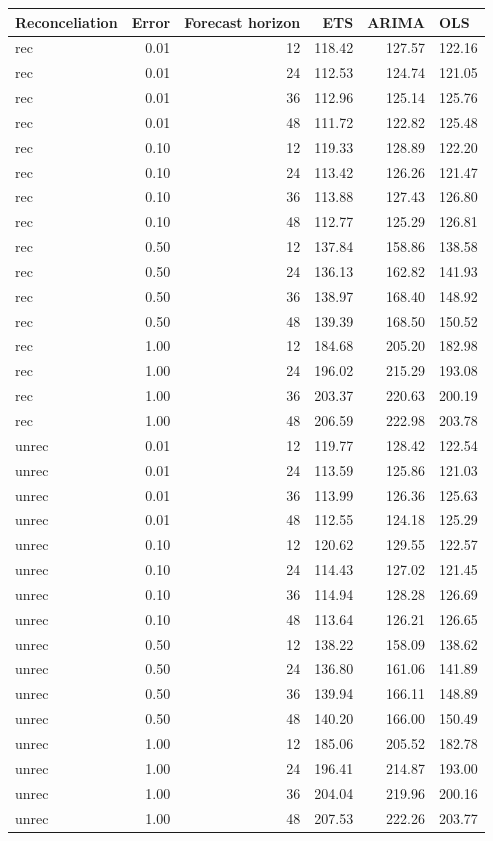\documentclass[11pt,a4paper,]{article}
\let\origtable\table
\let\endorigtable\endtable
\renewenvironment{table}[1][2] {
    \expandafter\origtable\expandafter[!htbp]
} {
    \endorigtable
}
\begin{document}
\begin{table}[!h]
\caption{\label{tab:TourismdatasimfixnoiseFH}Mean(RMSE) on one to four year test set with different error levels for ETS, ARIMA and OLS with and without reconciliation - Fixed origin - 304 bottom level series and 8 levels of hierarchy - Simulated tourism dataset}
\centering
\begin{tabular}[t]{lrrrrl}
\toprule
Reconceliation & Error & Forecast horizon & ETS & ARIMA & OLS\\
\midrule
rec & 0.01 & 12 & 118.42 & 127.57 & 122.16\\
rec & 0.01 & 24 & 112.53 & 124.74 & 121.05\\
rec & 0.01 & 36 & 112.96 & 125.14 & 125.76\\
rec & 0.01 & 48 & 111.72 & 122.82 & 125.48\\
rec & 0.10 & 12 & 119.33 & 128.89 & 122.20\\
rec & 0.10 & 24 & 113.42 & 126.26 & 121.47\\
rec & 0.10 & 36 & 113.88 & 127.43 & 126.80\\
rec & 0.10 & 48 & 112.77 & 125.29 & 126.81\\
rec & 0.50 & 12 & 137.84 & 158.86 & 138.58\\
rec & 0.50 & 24 & 136.13 & 162.82 & 141.93\\
rec & 0.50 & 36 & 138.97 & 168.40 & 148.92\\
rec & 0.50 & 48 & 139.39 & 168.50 & 150.52\\
rec & 1.00 & 12 & 184.68 & 205.20 & 182.98\\
rec & 1.00 & 24 & 196.02 & 215.29 & 193.08\\
rec & 1.00 & 36 & 203.37 & 220.63 & 200.19\\
rec & 1.00 & 48 & 206.59 & 222.98 & 203.78\\
unrec & 0.01 & 12 & 119.77 & 128.42 & 122.54\\
unrec & 0.01 & 24 & 113.59 & 125.86 & 121.03\\
unrec & 0.01 & 36 & 113.99 & 126.36 & 125.63\\
unrec & 0.01 & 48 & 112.55 & 124.18 & 125.29\\
unrec & 0.10 & 12 & 120.62 & 129.55 & 122.57\\
unrec & 0.10 & 24 & 114.43 & 127.02 & 121.45\\
unrec & 0.10 & 36 & 114.94 & 128.28 & 126.69\\
unrec & 0.10 & 48 & 113.64 & 126.21 & 126.65\\
unrec & 0.50 & 12 & 138.22 & 158.09 & 138.62\\
unrec & 0.50 & 24 & 136.80 & 161.06 & 141.89\\
unrec & 0.50 & 36 & 139.94 & 166.11 & 148.89\\
unrec & 0.50 & 48 & 140.20 & 166.00 & 150.49\\
unrec & 1.00 & 12 & 185.06 & 205.52 & 182.78\\
unrec & 1.00 & 24 & 196.41 & 214.87 & 193.00\\
unrec & 1.00 & 36 & 204.04 & 219.96 & 200.16\\
unrec & 1.00 & 48 & 207.53 & 222.26 & 203.77\\
\bottomrule
\end{tabular}
\end{table}
\end{document}
